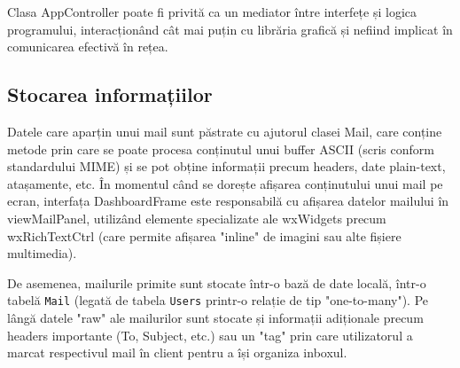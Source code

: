 \documentclass[runningheads]{llncs}
\begin{document}
Clasa AppController poate fi privită ca un mediator între interfețe și logica programului, interacționând cât mai puțin cu librăria grafică și nefiind implicat în comunicarea efectivă în rețea.


\subsection{Stocarea informațiilor}

Datele care aparțin unui mail sunt păstrate cu ajutorul clasei Mail, care conține metode prin care se poate procesa conținutul unui buffer ASCII (scris conform standardului MIME) și se pot obține informații precum headers, date plain-text, atașamente, etc. În momentul când se dorește afișarea conținutului unui mail pe ecran, interfața DashboardFrame este responsabilă cu afișarea datelor mailului în viewMailPanel, utilizând elemente specializate ale wxWidgets precum wxRichTextCtrl (care permite afișarea "inline" de imagini sau alte fișiere multimedia).

De asemenea, mailurile primite sunt stocate într-o bază de date locală, într-o tabelă \texttt{Mail} (legată de tabela \texttt{Users} printr-o relație de tip "one-to-many"). Pe lângă datele "raw" ale mailurilor sunt stocate și informații adiționale precum headers importante (To, Subject, etc.) sau un "tag" prin care utilizatorul a marcat respectivul mail în client pentru a își organiza inboxul.
\end{document}
